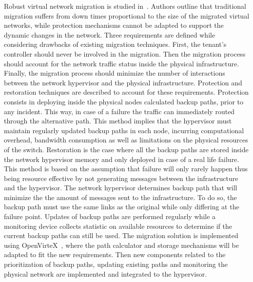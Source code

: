 Robust virtual network migration is studied in~\cite{Ko2017c}. Authors outline that traditional migration suffers from down times proportional to the size of the migrated virtual networks, while protection mechanisms cannot be adapted to support the dynamic changes in the network.
Three requirements are defined while considering drawbacks of existing migration techniques. 
First, the tenant's controller should never be involved in the migration.
Then the migration process should account for the network traffic status inside the physical infrastructure.
Finally, the migration process should minimize the number of interactions between the network hypervisor and the physical infrastructure.
Protection and restoration techniques are described to account for these requirements.
Protection consists in deploying inside the physical nodes calculated backup paths, prior to any incident.
This way, in case of a failure the traffic can immediately routed through the alternative path. 
This method implies that the hypervisor must maintain regularly updated backup paths in each node, incurring computational overhead, bandwidth consumption as well as limitations on the physical resources of the switch.
Restoration is the case where all the backup paths are stored inside the network hypervisor memory and only deployed in case of a real life failure.
This method is based on the assumption that failure will only rarely happen thus being resource effective by not generating messages between the infrastructure and the hypervisor.
The network hypervisor determines backup path that will minimize the the amount of messages sent to the infrastructure.
To do so, the backup path must use the same links as the original while only differing at the failure point.
Updates of backup paths are performed regularly while a monitoring device collects statistic on available resources to determine if the current backup paths can still be used.
The migration solution is implemented using OpenVirteX~\cite{OpenVirteX-Al-Shabibi2014}, where the path calculator and storage mechanisms will be adapted to fit the new requirements. Then new components related to the prioritization of backup paths, updating existing paths and monitoring the physical network are implemented and integrated to the hypervisor.

